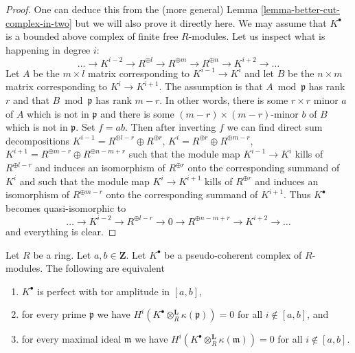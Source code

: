 \begin{proof}
One can deduce this from the (more general)
Lemma \ref{lemma-better-cut-complex-in-two}
but we will also prove it directly here.
We may assume that $K^\bullet$ is a bounded above
complex of finite free $R$-modules. Let us inspect what is happening
in degree $i$:
$$
\ldots \to K^{i - 2} \to R^{\oplus l}
\to R^{\oplus m} \to R^{\oplus n} \to K^{i + 2} \to \ldots
$$
Let $A$ be the $m \times l$ matrix corresponding to $K^{i - 1} \to K^i$
and let $B$ be the $n \times m$ matrix corresponding to $K^i \to K^{i + 1}$.
The assumption is that $A \bmod \mathfrak p$ has rank $r$ and that
$B \bmod \mathfrak p$ has rank $m - r$. In other words, there is some
$r \times r$ minor $a$ of $A$ which is not in $\mathfrak p$ and there is
some $(m - r) \times (m - r)$-minor $b$ of $B$ which is not in $\mathfrak p$.
Set $f = ab$. Then after inverting $f$ we can find direct sum decompositions
$K^{i - 1} = R^{\oplus l - r} \oplus R^{\oplus r}$,
$K^i = R^{\oplus r} \oplus R^{\oplus m - r}$,
$K^{i + 1} = R^{\oplus m - r} \oplus R^{\oplus n - m + r}$
such that the module map $K^{i - 1} \to K^i$ kills of
$R^{\oplus l - r}$ and induces an isomorphism of $R^{\oplus r}$ onto the
corresponding summand of $K^i$ and such that the module map $K^i \to K^{i + 1}$
kills of $R^{\oplus r}$ and induces an isomorphism of $R^{\oplus m - r}$
onto the corresponding summand of $K^{i + 1}$. Thus $K^\bullet$ becomes
quasi-isomorphic to
$$
\ldots \to K^{i - 2} \to R^{\oplus l - r}
\to 0 \to R^{\oplus n - m + r} \to K^{i + 2} \to \ldots
$$
and everything is clear.
\end{proof}

\begin{lemma}
\label{lemma-check-perfect-pointwise}
Let $R$ be a ring. Let $a, b \in \mathbf{Z}$.
Let $K^\bullet$ be a pseudo-coherent complex of $R$-modules.
The following are equivalent
\begin{enumerate}
\item $K^\bullet$ is perfect with tor amplitude in $[a, b]$,
\item for every prime $\mathfrak p$ we have
$H^i(K^\bullet \otimes_R^{\mathbf{L}} \kappa(\mathfrak p)) = 0$ for all
$i \not \in [a, b]$, and
\item for every maximal ideal $\mathfrak m$ we have
$H^i(K^\bullet \otimes_R^{\mathbf{L}} \kappa(\mathfrak m)) = 0$ for all
$i \not \in [a, b]$.
\end{enumerate}
\end{lemma}

